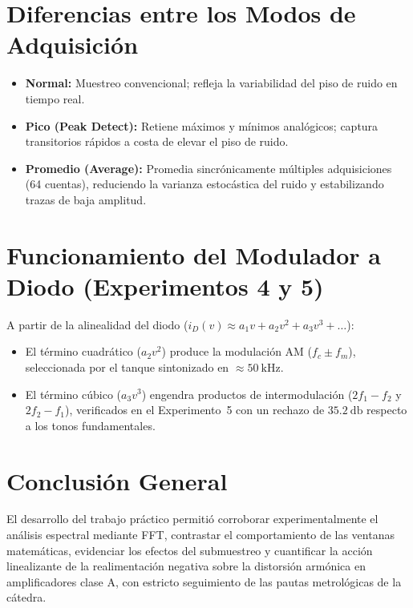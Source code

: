 \section{Diferencias entre los Modos de Adquisición}
\begin{itemize}[noitemsep, topsep=2pt]
    \item \textbf{Normal:} Muestreo convencional; refleja la variabilidad del piso de ruido en tiempo real.
    \item \textbf{Pico (Peak Detect):} Retiene máximos y mínimos analógicos; captura transitorios rápidos a costa de elevar el piso de ruido.
    \item \textbf{Promedio (Average):} Promedia sincrónicamente múltiples adquisiciones (64 cuentas), reduciendo la varianza estocástica del ruido y estabilizando trazas de baja amplitud.
\end{itemize}

\section{Funcionamiento del Modulador a Diodo (Experimentos 4 y 5)}
A partir de la alinealidad del diodo ($i_D(v) \approx a_1 v + a_2 v^2 + a_3 v^3 + \dots$):
\begin{itemize}[noitemsep, topsep=2pt]
    \item El término cuadrático ($a_2 v^2$) produce la modulación AM ($f_c \pm f_m$), seleccionada por el tanque sintonizado en $\approx \qty{50}{\kilo\hertz}$.
    \item El término cúbico ($a_3 v^3$) engendra productos de intermodulación ($2f_1 - f_2$ y $2f_2 - f_1$), verificados en el Experimento~5 con un rechazo de $\qty{35.2}{\decibel}$ respecto a los tonos fundamentales.
\end{itemize}

\section{Conclusión General}
El desarrollo del trabajo práctico permitió corroborar experimentalmente el análisis espectral mediante FFT, contrastar el comportamiento de las ventanas matemáticas, evidenciar los efectos del submuestreo y cuantificar la acción linealizante de la realimentación negativa sobre la distorsión armónica en amplificadores clase A, con estricto seguimiento de las pautas metrológicas de la cátedra.

